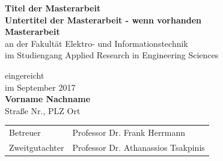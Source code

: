 \begin{center}
    \vspace*{4cm} %
    \Large
	\textbf{Titel der Masterarbeit}\\ %
    \large
    \textbf{Untertitel der Masterarbeit - wenn vorhanden}\\ %
    
    \vspace*{2cm} %
    \textbf{Masterarbeit}\\ %
    \vspace*{1cm}
    \large
        an der Fakultät Elektro- und Informationstechnik\\
        im Studiengang Applied Research in Engineering Sciences
    \\ %
    
    \vspace*{2cm} 
    \normalsize
    
    \begin{center}
        eingereicht\\
        im September 2017\\
        \textbf{Vorname Nachname}\\
        Straße Nr., PLZ Ort
        
        
    \end{center}
    
    \vspace*{2cm}      
    
    \begin{table}[H]
        \centering
        \begin{tabular}{ll}
            Betreuer & Professor Dr. Frank Herrmann \\
            Zweitgutachter & Professor Dr. Athanassios Tsakpinis \\
        \end{tabular}%
    \end{table}%
        
\end{center}